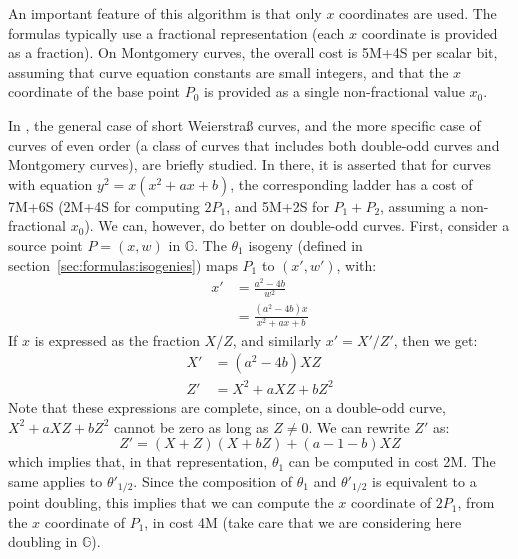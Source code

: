 \documentclass{llncs}
\newcommand{\bG}{\mathbb{G}}
\begin{document}
An important feature of this algorithm is that only $x$ coordinates are
used. The formulas typically use a fractional representation (each $x$
coordinate is provided as a fraction). On Montgomery curves, the overall
cost is 5M+4S per scalar bit, assuming that curve equation constants are
small integers, and that the $x$ coordinate of the base point $P_0$ is
provided as a single non-fractional value $x_0$.

In \cite{CosSmi2018}, the general case of short Weierstraß curves, and
the more specific case of curves of even order (a class of curves that
includes both double-odd curves and Montgomery curves), are briefly
studied. In there, it is asserted that for curves with equation $y^2 =
x(x^2 + ax + b)$, the corresponding ladder has a cost of 7M+6S (2M+4S
for computing $2P_1$, and 5M+2S for $P_1+P_2$, assuming a non-fractional
$x_0$). We can, however, do better on double-odd curves. First, consider
a source point $P = (x, w)$ in $\bG$. The $\theta_1$ isogeny (defined in
section~\ref{sec:formulas:isogenies}) maps $P_1$ to $(x', w')$, with:
\begin{align*}
    x' &= \frac{a^2-4b}{w^2} \\
       &= \frac{(a^2-4b) x}{x^2 + ax + b}
\end{align*}
If $x$ is expressed as the fraction $X/Z$, and similarly $x' = X'/Z'$,
then we get:
\begin{align*}
    X' &= (a^2-4b) XZ \\
    Z' &= X^2 + aXZ + bZ^2
\end{align*}
Note that these expressions are complete, since, on a double-odd curve,
$X^2 + aXZ + bZ^2$ cannot be zero as long as $Z\neq 0$. We can rewrite
$Z'$ as:
\begin{equation*}
    Z' = (X + Z)(X + bZ) + (a - 1 - b) XZ
\end{equation*}
which implies that, in that representation, $\theta_1$ can be computed
in cost 2M. The same applies to $\theta'_{1/2}$. Since the composition
of $\theta_1$ and $\theta'_{1/2}$ is equivalent to a point doubling,
this implies that we can compute the $x$ coordinate of $2P_1$, from the
$x$ coordinate of $P_1$, in cost 4M (take care that we are considering
here doubling in $\bG$).
\end{document}
